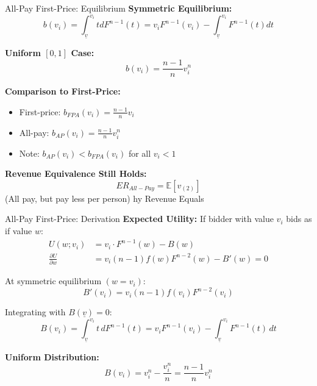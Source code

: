 \documentclass[xcolor={x11names}, aspectratio=169 ]{beamer}
\newcommand{\E}{\mathbb{E}}
\begin{document}
\begin{frame}{All-Pay First-Price: Equilibrium}
\textbf{Symmetric Equilibrium:}
$$b(v_i) = \int_{\underline{v}}^{v_i} t dF^{n-1}(t) = v_i F^{n-1}(v_i) - \int_{\underline{v}}^{v_i} F^{n-1}(t)dt$$

\textbf{Uniform $[0,1]$ Case:}
$$\boxed{b(v_i) = \frac{n-1}{n} v_i^n}$$

\textbf{Comparison to First-Price:}
\begin{itemize}
  \item First-price: $b_{FPA}(v_i) = \frac{n-1}{n} v_i$
  \item All-pay: $b_{AP}(v_i) = \frac{n-1}{n} v_i^n$
  \item Note: $b_{AP}(v_i) < b_{FPA}(v_i)$ for all $v_i < 1$
\end{itemize}

\textbf{Revenue Equivalence Still Holds:}
$$ER_{All-Pay} = \E[v_{(2)}]$$
(All pay, but pay less per person)
hy Revenue Equals \end{frame}

\begin{frame}{All-Pay First-Price: Derivation}
\textbf{Expected Utility:} If bidder with value $v_i$ bids as if value $w$:
\begin{align*}
U(w; v_i) &= v_i \cdot F^{n-1}(w) - B(w) \\
\frac{\partial U}{\partial w} &= v_i(n-1)f(w)F^{n-2}(w) - B'(w) = 0
\end{align*}

At symmetric equilibrium $(w = v_i)$:
$$B'(v_i) = v_i(n-1)f(v_i)F^{n-2}(v_i)$$

Integrating with $B(\underline{v}) = 0$:
$$B(v_i) = \int_{\underline{v}}^{v_i} t \, dF^{n-1}(t) = v_i F^{n-1}(v_i) - \int_{\underline{v}}^{v_i} F^{n-1}(t) \, dt$$

\textbf{Uniform Distribution:}
$$B(v_i) = v_i^n - \frac{v_i^n}{n} = \frac{n-1}{n} v_i^n$$
\end{frame}
\end{document}
